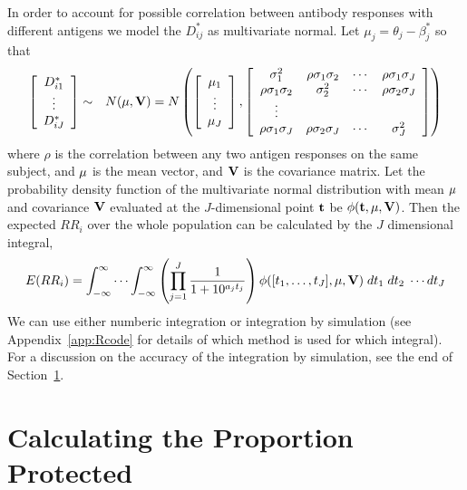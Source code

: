 \documentclass{article}[12pt]
\begin{document}
In order to account for possible correlation between antibody responses with different antigens we model the 
$D_{ij}^*$ as multivariate normal. Let $\mu_j=\theta_j-\beta_j^*$ so that  
\begin{eqnarray*}
\left[ \begin{array}{c} 
D^*_{i1} \\
\vdots \\
D^*_{iJ} 
\end{array} 
\right] & \sim & N({\bf \mu}, {\bf V}) =  N \left( \left[ \begin{array}{c} 
\mu_{1} \\
\vdots \\
\mu_{J} 
\end{array} 
\right], \left[ \begin{array}{cccc} 
\sigma_{1}^2 & \rho \sigma_1 \sigma_2 & \cdots & \rho \sigma_1 \sigma_J \\
\rho \sigma_1 \sigma_2 & \sigma^2_2 & \cdots & \rho \sigma_2 \sigma_J \\
\vdots \\
\rho \sigma_1 \sigma_J & \rho \sigma_2 \sigma_J & \cdots & \sigma_J^2 \\
\end{array} 
\right] \right) 
\end{eqnarray*} 
where $\rho$ is the correlation between any two antigen responses on the same subject, and 
${\bf \mu}$ is the mean vector, and ${\bf V}$ is the covariance matrix. 
Let the probability density function of the multivariate normal distribution with mean ${\bf \mu}$ and 
covariance ${\bf V}$ evaluated at the $J$-dimensional point ${\bf t}$ be  $\phi({\bf t}, {\bf \mu},{\bf V})$. 
Then the expected $RR_i$ over the whole population can be calculated by the $J$ dimensional integral, 
\begin{eqnarray}
E(RR_i) = \int_{-\infty}^{\infty} \cdots \int_{-\infty}^{\infty}   \left( \prod_{j=1}^{J} \frac{ 1}{1+10^{a_j  t_{j}   } } \right)
\phi([t_1,\ldots,t_J],{\bf \mu}, {\bf V}) \; dt_1 \; dt_2 \; \cdots dt_J
\label{eq:meanRR}
\end{eqnarray}
We can use either numberic integration or integration by simulation (see Appendix~\ref{app:Rcode} for details of which method is used 
for which integral). For a discussion on the accuracy of the integration by simulation, see the end of Section~\ref{sec:pp}.



\section{Calculating the Proportion Protected} 
\label{sec:pp}
\end{document}
